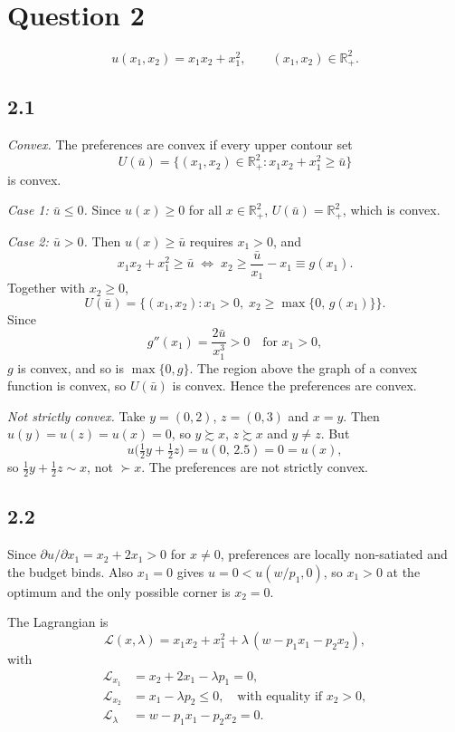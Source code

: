 \documentclass[12pt,letterpaper]{article}
\begin{document}
\section*{Question 2}

\[
u(x_1,x_2) = x_1x_2 + x_1^2, \qquad (x_1,x_2)\in\mathbb{R}^2_+ .
\]

\subsection*{2.1}

\textit{Convex.} The preferences are convex if every upper contour set
\[
U(\bar u) = \{(x_1,x_2)\in\mathbb{R}^2_+ : x_1x_2 + x_1^2 \ge \bar u\}
\]
is convex.

\textit{Case 1: $\bar u\le 0$.} Since $u(x)\ge 0$ for all $x\in\mathbb{R}^2_+$, $U(\bar u)=\mathbb{R}^2_+$, which is convex.

\textit{Case 2: $\bar u>0$.} Then $u(x)\ge\bar u$ requires $x_1>0$, and
\[
x_1x_2 + x_1^2 \ge \bar u \;\Longleftrightarrow\; x_2 \ge \frac{\bar u}{x_1} - x_1 \equiv g(x_1).
\]
Together with $x_2\ge 0$,
\[
U(\bar u) = \Big\{(x_1,x_2) : x_1>0,\; x_2 \ge \max\{0,\,g(x_1)\}\Big\}.
\]
Since
\[
g''(x_1) = \frac{2\bar u}{x_1^3} > 0 \quad \text{for } x_1>0,
\]
$g$ is convex, and so is $\max\{0,g\}$. The region above the graph of a convex function is convex, so $U(\bar u)$ is convex. Hence the preferences are convex.

\textit{Not strictly convex.} Take $y=(0,2)$, $z=(0,3)$ and $x=y$. Then $u(y)=u(z)=u(x)=0$, so $y\succsim x$, $z\succsim x$ and $y\neq z$. But
\[
u\big(\tfrac12 y + \tfrac12 z\big) = u(0,\,2.5) = 0 = u(x),
\]
so $\tfrac12 y+\tfrac12 z\sim x$, not $\succ x$. The preferences are not strictly convex.

\subsection*{2.2}

Since $\partial u/\partial x_1 = x_2+2x_1>0$ for $x\neq 0$, preferences are locally non-satiated and the budget binds. Also $x_1=0$ gives $u=0<u(w/p_1,0)$, so $x_1>0$ at the optimum and the only possible corner is $x_2=0$.

The Lagrangian is
\[
\mathcal{L}(x,\lambda) = x_1x_2 + x_1^2 + \lambda\,(w - p_1x_1 - p_2x_2),
\]
with
\begin{align*}
\mathcal{L}_{x_1} &= x_2 + 2x_1 - \lambda p_1 = 0,\\
\mathcal{L}_{x_2} &= x_1 - \lambda p_2 \le 0, \quad \text{with equality if } x_2>0,\\
\mathcal{L}_{\lambda} &= w - p_1x_1 - p_2x_2 = 0 .
\end{align*}
\end{document}
